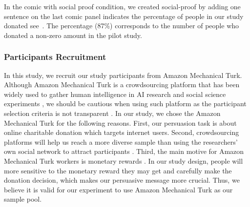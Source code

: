 

In the comic with social proof condition, we created social-proof by adding one sentence on the last comic panel indicates the percentage of people in our study donated see~. The percentage (87\%) corresponds to the number of people who donated a non-zero amount in the pilot study.


\subsubsection{Participants Recruitment}
In this study, we recruit our study participants from Amazon Mechanical Turk. Although Amazon Mechanical Turk is a crowdsourcing platform that has been widely used to gather human intelligence in AI research and social science experiments \cite{paolacci2010running, paolacci2014inside,berinsky2012evaluating}, we should be cautious when using such platform as the participant selection criteria is not transparent \cite{landers2015inconvenient}. In our study, we chose the Amazon Mechanical Turk for the following reasons. First, our persuasion task is about online charitable donation which targets internet users. Second, crowdsourcing platforms will help us reach a more diverse sample than using the researchers' own social network to attract participants \cite{mason2012conducting}. Third, the main motive for Amazon Mechanical Turk workers is monetary rewards \cite{berinsky2012evaluating}. In our study design, people will more sensitive to the monetary reward they may get and carefully make the donation decision, which makes our persuasive message more crucial. Thus, we believe it is valid for our experiment to use Amazon Mechanical Turk as our sample pool. 

